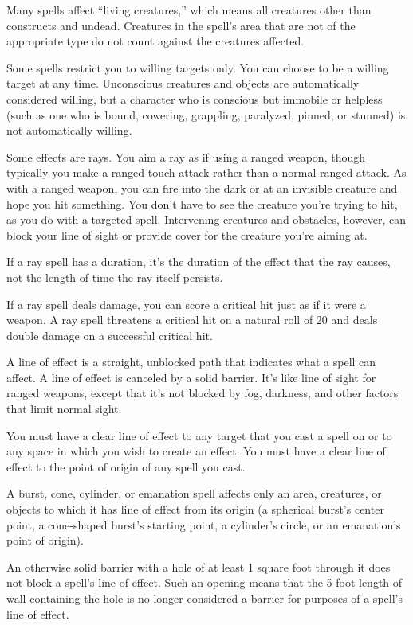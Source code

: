  Many spells affect ``living creatures,'' which means all creatures other than constructs and undead. Creatures in the spell's area that are not of the appropriate type do not count against the creatures affected.

 Some spells restrict you to willing targets only. You can choose to be a willing target at any time. Unconscious creatures and objects are automatically considered willing, but a character who is conscious but immobile or helpless (such as one who is bound, cowering, grappling, paralyzed, pinned, or stunned) is not automatically willing.

 Some effects are rays. You aim a ray as if using a ranged weapon, though typically you make a ranged touch attack rather than a normal ranged attack. As with a ranged weapon, you can fire into the dark or at an invisible creature and hope you hit something. You don't have to see the creature you're trying to hit, as you do with a targeted spell. Intervening creatures and obstacles, however, can block your line of sight or provide cover for the creature you're aiming at.

If a ray spell has a duration, it's the duration of the effect that the ray causes, not the length of time the ray itself persists.

If a ray spell deals damage, you can score a critical hit just as if it were a weapon. A ray spell threatens a critical hit on a natural roll of 20 and deals double damage on a successful critical hit.

 A line of effect is a straight, unblocked path that indicates what a spell can affect. A line of effect is canceled by a solid barrier. It's like line of sight for ranged weapons, except that it's not blocked by fog, darkness, and other factors that limit normal sight.

You must have a clear line of effect to any target that you cast a spell on or to any space in which you wish to create an effect. You must have a clear line of effect to the point of origin of any spell you cast.

A burst, cone, cylinder, or emanation spell affects only an area, creatures, or objects to which it has line of effect from its origin (a spherical burst's center point, a cone-shaped burst's starting point, a cylinder's circle, or an emanation's point of origin).

An otherwise solid barrier with a hole of at least 1 square foot through it does not block a spell's line of effect. Such an opening means that the 5-foot length of wall containing the hole is no longer considered a barrier for purposes of a spell's line of effect.


